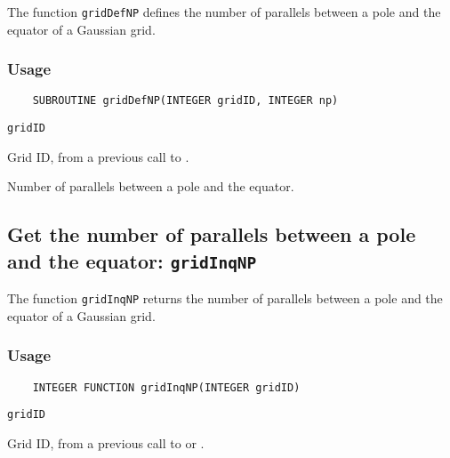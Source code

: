 The function {\tt gridDefNP} defines the number of parallels between a pole and the equator
of a Gaussian grid.

\subsubsection*{Usage}

\begin{verbatim}
    SUBROUTINE gridDefNP(INTEGER gridID, INTEGER np)
\end{verbatim}

\hspace*{4mm}\begin{minipage}[]{15cm}
\begin{deflist}{\tt gridID\ }
\item[{\tt gridID}]
Grid ID, from a previous call to {}.
\item[{\tt np}]
Number of parallels between a pole and the equator.

\end{deflist}
\end{minipage}


\subsection{Get the number of parallels between a pole and the equator: {\tt gridInqNP}}
\label{gridInqNP}

The function {\tt gridInqNP} returns the number of parallels between a pole and the equator
of a Gaussian grid.

\subsubsection*{Usage}

\begin{verbatim}
    INTEGER FUNCTION gridInqNP(INTEGER gridID)
\end{verbatim}

\hspace*{4mm}\begin{minipage}[]{15cm}
\begin{deflist}{\tt gridID\ }
\item[{\tt gridID}]
Grid ID, from a previous call to {} or {}.

\end{deflist}
\end{minipage}

